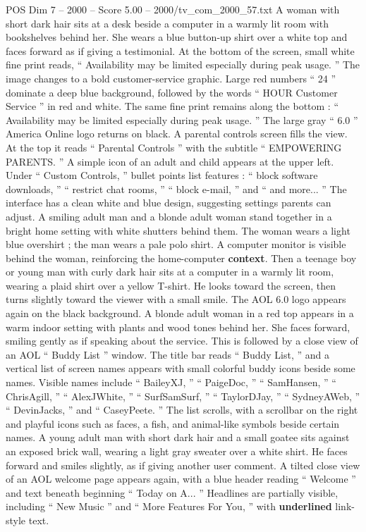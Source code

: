 \begin{textsample}{POS Dim 7 – 2000 – Score 5.00 – 2000/tv\_com\_2000\_57.txt}
A woman with short dark hair sits at a desk beside a computer in a warmly lit room with bookshelves behind her.
She wears a blue button-up shirt over a white top and faces forward as if giving a testimonial.
At the bottom of the screen, small white fine print reads, “ Availability may be limited especially during peak usage. ” The image changes to a bold customer-service graphic.
Large red numbers “ 24 ” dominate a deep blue background, followed by the words “ HOUR Customer Service ” in red and white.
The same fine print remains along the bottom : “ Availability may be limited especially during peak usage. ” The large gray “ 6.0 ” America Online logo returns on black.
A parental controls screen fills the view.
At the top it reads “ Parental Controls ” with the subtitle “ EMPOWERING PARENTS. ” A simple icon of an adult and child appears at the upper left.
Under “ Custom Controls, ” bullet points list features : “ block software downloads, ” “ restrict chat rooms, ” “ block e-mail, ” and “ and more... ” The interface has a clean white and blue design, suggesting settings parents can adjust.
A smiling adult man and a blonde adult woman stand together in a bright home setting with white shutters behind them.
The woman wears a light blue overshirt ; the man wears a pale polo shirt.
A computer monitor is visible behind the woman, reinforcing the home-computer \textbf{context}.
Then a teenage boy or young man with curly dark hair sits at a computer in a warmly lit room, wearing a plaid shirt over a yellow T-shirt.
He looks toward the screen, then turns slightly toward the viewer with a small smile.
The AOL 6.0 logo appears again on the black background.
A blonde adult woman in a red top appears in a warm indoor setting with plants and wood tones behind her.
She faces forward, smiling gently as if speaking about the service.
This is followed by a close view of an AOL “ Buddy List ” window.
The title bar reads “ Buddy List, ” and a vertical list of screen names appears with small colorful buddy icons beside some names.
Visible names include “ BaileyXJ, ” “ PaigeDoc, ” “ SamHansen, ” “ ChrisAgill, ” “ AlexJWhite, ” “ SurfSamSurf, ” “ TaylorDJay, ” “ SydneyAWeb, ” “ DevinJacks, ” and “ CaseyPeete. ” The list scrolls, with a scrollbar on the right and playful icons such as faces, a fish, and animal-like symbols beside certain names.
A young adult man with short dark hair and a small goatee sits against an exposed brick wall, wearing a light gray sweater over a white shirt.
He faces forward and smiles slightly, as if giving another user comment.
A tilted close view of an AOL welcome page appears again, with a blue header reading “ Welcome ” and text beneath beginning “ Today on A... ” Headlines are partially visible, including “ New Music ” and “ More Features For You, ” with \textbf{underlined} link-style text.

\end{textsample}
